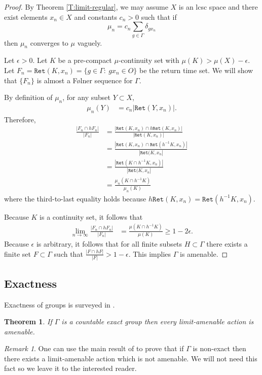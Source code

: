 \documentclass[12pt]{article}
\theoremstyle{plain}
\newtheorem{thm}{Theorem}[section]
\theoremstyle{definition}
\theoremstyle{remark}
\newtheorem{remark}{Remark}
\newcommand{\G}{\Gamma}
\newcommand{\eps}{\epsilon}
\renewcommand\d{\delta}
\newcommand\Ret{\mathtt{Ret}}
\begin{document}
\begin{proof}
By Theorem \ref{T:limit-regular}, we may assume $X$ is an lcsc space and there exist elements $x_n \in X$ and constants $c_n>0$ such that if 
$$\mu_n = c_n \sum_{g\in \G} \d_{gx_n}$$
then $\mu_n$ converges to $\mu$ vaguely. 

Let $\eps>0$. Let $K$ be a pre-compact $\mu$-continuity set with $\mu(K)>\mu(X)-\eps$. Let $F_n=\Ret(K,x_n)=\{g\in \G:~gx_n \in O\}$ be the return time set. We will show that $\{F_n\}$ is almost a F\o lner sequence for $\G$. 

By definition of $\mu_n$, for any subset $Y \subset X$,
\begin{align*}
\mu_n(Y) &=c_n |\Ret(Y,x_n)|.
\end{align*}
Therefore,
\begin{align*}
\frac{|F_n \cap h F_n|}{|F_n|} &= \frac{|\Ret(K,x_n) \cap h \Ret(K,x_n)|}{|\Ret(K,x_n)|} \\
&= \frac{|\Ret(K,x_n) \cap \Ret(h^{-1}K,x_n)|}{|\Ret(K,x_n|}\\
&= \frac{|\Ret(K \cap h^{-1}K,x_n)|}{|\Ret(K,x_n|}\\
&= \frac{\mu_n(K\cap h^{-1}K)}{\mu_n(K)}
\end{align*}
where the third-to-last equality holds because $h \Ret(K,x_n)= \Ret(h^{-1}K,x_n)$.

Because $K$ is a continuity set, it follows that
\begin{align*}
\lim_{n\to\infty} \frac{|F_n \cap h F_n|}{|F_n|} 
&= \frac{\mu(K\cap h^{-1}K)}{\mu(K)} \ge 1-2\eps.
\end{align*}
Because $\eps$ is arbitrary, it follows that for all finite subsets $H \subset \G$ there exists a finite set $F \subset \G$ such that $\frac{|F \cap hF|}{|F|} > 1-\eps$. This implies $\G$ is amenable.
\end{proof}





\subsection{Exactness}
Exactness of groups is surveyed in \cite{anantharaman-survey}.

\begin{thm}\label{T:exact}
If $\G$ is a countable exact group then every limit-amenable action is amenable. 
\end{thm}

\begin{remark}
One can use the main result of \cite{jardónsánchez2025exactnesstopologyspaceinvariant} to prove that if $\G$ is non-exact then there exists a limit-amenable action which is not amenable. We will not need this fact so we leave it to the interested reader.
\end{remark}
\end{document}
